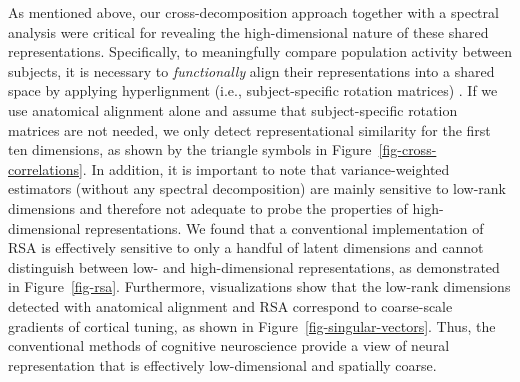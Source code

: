 \documentclass[10pt]{article}
\begin{document}
As mentioned above, our cross-decomposition approach together with a
spectral analysis were critical for revealing the high-dimensional
nature of these shared representations. Specifically, to meaningfully
compare population activity between subjects, it is necessary to
\emph{functionally} align their representations into a shared space by
applying hyperlignment (i.e., subject-specific rotation matrices)
\autocite{Haxby2011}. If we use anatomical alignment alone and assume
that subject-specific rotation matrices are not needed, we only detect
representational similarity for the first ten dimensions, as shown by
the triangle symbols in Figure~\ref{fig-cross-correlations}. In
addition, it is important to note that variance-weighted estimators
(without any spectral decomposition) are mainly sensitive to low-rank
dimensions and therefore not adequate to probe the properties of
high-dimensional representations. We found that a conventional
implementation of RSA is effectively sensitive to only a handful of
latent dimensions and cannot distinguish between low- and
high-dimensional representations, as demonstrated in
Figure~\ref{fig-rsa}. Furthermore, visualizations show that the low-rank
dimensions detected with anatomical alignment and RSA correspond to
coarse-scale gradients of cortical tuning, as shown in
Figure~\ref{fig-singular-vectors}. Thus, the conventional methods of
cognitive neuroscience provide a view of neural representation that is
effectively low-dimensional and spatially coarse.
\end{document}
